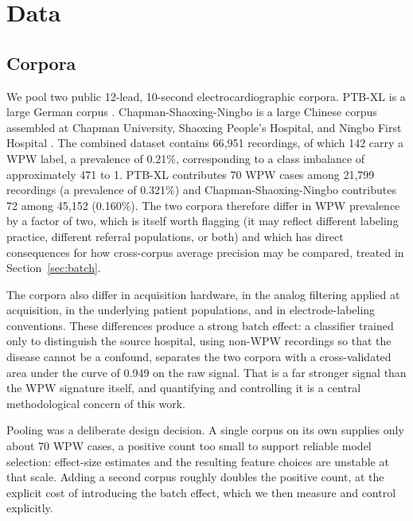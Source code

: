 \documentclass[11pt]{article}
\begin{document}
\FloatBarrier
\section{Data}

\subsection{Corpora}

We pool two public 12-lead, 10-second electrocardiographic corpora. PTB-XL is a large German corpus \cite{ptbxl}. Chapman-Shaoxing-Ningbo is a large Chinese corpus assembled at Chapman University, Shaoxing People's Hospital, and Ningbo First Hospital \cite{csn_physionet,csn_nature}. The combined dataset contains 66{,}951 recordings, of which 142 carry a WPW label, a prevalence of 0.21\%, corresponding to a class imbalance of approximately 471 to 1. PTB-XL contributes 70 WPW cases among 21{,}799 recordings (a prevalence of 0.321\%) and Chapman-Shaoxing-Ningbo contributes 72 among 45{,}152 (0.160\%). The two corpora therefore differ in WPW prevalence by a factor of two, which is itself worth flagging (it may reflect different labeling practice, different referral populations, or both) and which has direct consequences for how cross-corpus average precision may be compared, treated in Section~\ref{sec:batch}.

The corpora also differ in acquisition hardware, in the analog filtering applied at acquisition, in the underlying patient populations, and in electrode-labeling conventions. These differences produce a strong batch effect: a classifier trained only to distinguish the source hospital, using non-WPW recordings so that the disease cannot be a confound, separates the two corpora with a cross-validated area under the curve of 0.949 on the raw signal. That is a far stronger signal than the WPW signature itself, and quantifying and controlling it is a central methodological concern of this work.

Pooling was a deliberate design decision. A single corpus on its own supplies only about 70 WPW cases, a positive count too small to support reliable model selection: effect-size estimates and the resulting feature choices are unstable at that scale. Adding a second corpus roughly doubles the positive count, at the explicit cost of introducing the batch effect, which we then measure and control explicitly.
\end{document}
